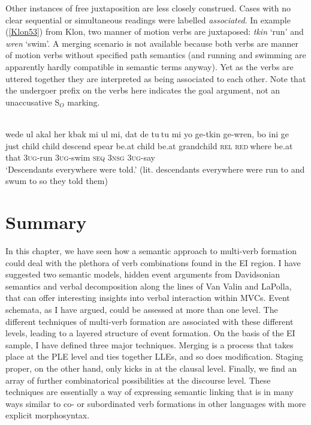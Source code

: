 {Other instances of free juxtaposition are less closely construed. Cases with no clear sequential or simultaneous readings were labelled \textit{associated}. In example (\ref{Klon53}) from Klon, two manner of motion verbs are juxtaposed: \textit{tkin} `run' and \textit{wren} `swim'. A merging scenario is not available because both verbs are manner of motion verbs without specified path semantics (and running and swimming are apparently hardly compatible in semantic terms anyway). Yet as the verbs are uttered together they are interpreted as being associated to each other. Note that the undergoer prefix on the verbs here indicates the goal argument, not an unaccusative S$_O$ marking. 

\ea \label{Klon53}
\\
\gll wede ul akal her kbak mi ul mi, dat de tu$~$tu mi yo ge-tkin ge-wren, bo ini ge \\
just child child descend spear be.at child be.at grandchild \textsc{rel} \textsc{red}$~$where be.at that 3\textsc{ug}-run 3\textsc{ug}-swim \textsc{seq} 3\textsc{nsg} 3\textsc{ug}-say \\
\glft `Descendants everywhere were told.' (lit. descendants everywhere were run to and swum to so they told them) \\ 
\z

\section{Summary} \label{sec:sum-sem}

In this chapter, we have seen how a semantic approach to multi-verb formation could deal with the plethora of verb combinations found in the EI region. I have suggested two semantic models, hidden event arguments from Davidsonian semantics and verbal decomposition along the lines of Van Valin and LaPolla, that can offer interesting insights into verbal interaction within MVCs. Event schemata, as I have argued, could be assessed at more than one level. The different techniques of multi-verb formation are associated with these different levels, leading to a layered structure of event formation. On the basis of the EI sample, I have defined three major techniques. Merging is a process that takes place at the PLE level and ties together LLEs, and so does modification. Staging proper, on the other hand, only kicks in at the clausal level. Finally, we find an array of further combinatorical possibilities at the discourse level. These techniques are essentially a way of expressing semantic linking that is in many ways similar to co- or subordinated verb formations in other languages with more explicit morphosyntax.

}
